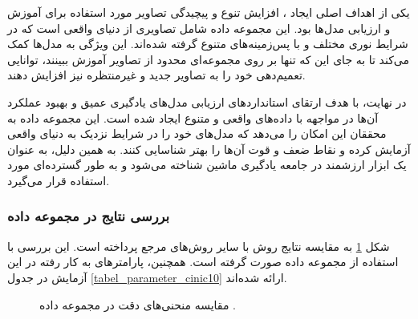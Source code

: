 یکی از اهداف اصلی ایجاد
،
افزایش تنوع و پیچیدگی تصاویر مورد استفاده برای آموزش و ارزیابی مدل‌ها بود. این مجموعه داده شامل تصاویری از دنیای واقعی است که در شرایط نوری مختلف و با پس‌زمینه‌های متنوع گرفته شده‌اند. این ویژگی به مدل‌ها کمک می‌کند تا به جای این که تنها بر روی مجموعه‌ای محدود از تصاویر آموزش ببینند، توانایی تعمیم‌دهی خود را به تصاویر جدید و غیرمنتظره نیز افزایش دهند.

در نهایت،
با هدف ارتقای استانداردهای ارزیابی مدل‌های یادگیری عمیق و بهبود عملکرد آن‌ها در مواجهه با داده‌های واقعی و متنوع ایجاد شده است. این مجموعه داده به محققان این امکان را می‌دهد که مدل‌های خود را در شرایط نزدیک به دنیای واقعی آزمایش کرده و نقاط ضعف و قوت آن‌ها را بهتر شناسایی کنند. به همین دلیل،
به عنوان یک ابزار ارزشمند در جامعه یادگیری ماشین شناخته می‌شود و به طور گسترده‌ای مورد استفاده قرار می‌گیرد.


\vspace{3mm}
\subsubsection{
	بررسی نتایج در مجموعه داده
}\vspace{-1mm}


شکل
\ref{result_cinic10}
به مقایسه نتایج روش
با سایر روش‌های مرجع پرداخته است. این بررسی با استفاده از مجموعه داده
صورت گرفته است. همچنین، پارامترهای به کار رفته در این آزمایش در جدول
\ref{tabel_parameter_cinic10}
ارائه شده‌اند.

\begin{figure}[h]
	\centering
	\hspace{0.8mm}
	\caption{
		مقایسه منحنی‌های دقت در مجموعه داده
		.
	}
	\label{result_cinic10}
\end{figure}


